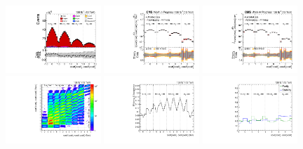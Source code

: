 \begin{refsection}
\begin{figure}[htb]
\end{figure}
\clearpage
\begin{figure}[htb]
\begin{center}
 \includegraphics[width=0.32\textwidth]{fig_fullRun2UL/controlplots/combined/Hyp_LLBarCMnr_vs_TTBarMass.pdf}
 \includegraphics[width=0.32\textwidth]{fig_fullRun2UL/unfolding/combined/UnfoldedResults_c_Mnr_mttbar.pdf}
 \includegraphics[width=0.32\textwidth]{fig_fullRun2UL/unfolding/combined/UnfoldedResultsNorm_c_Mnr_mttbar.pdf} \\
 \includegraphics[width=0.32\textwidth]{fig_fullRun2UL/unfolding/combined/ResponseMatrix_c_Mnr_mttbar.pdf}
 \includegraphics[width=0.32\textwidth]{fig_fullRun2UL/unfolding/combined/TotEff_c_Mnr_mttbar.pdf}
 \includegraphics[width=0.32\textwidth]{fig_fullRun2UL/unfolding/combined/PurStab_c_Mnr_mttbar.pdf} \\

\end{center}
\end{figure}
\end{refsection}
